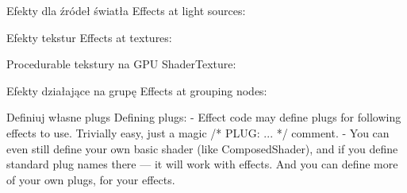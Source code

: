 \documentclass{beamer}
\begin{document}
\begin{frame}{Efekty dla źródeł światła}
  Effects at light sources:
\end{frame}

\begin{frame}{Efekty tekstur}
  Effects at textures:
\end{frame}

\begin{frame}{Procedurable tekstury na GPU}
  ShaderTexture:
\end{frame}

\begin{frame}{Efekty działające na grupę}
  Effects at grouping nodes:
\end{frame}

\begin{frame}{Definiuj własne plugs}
  Defining plugs:
  - Effect code may define plugs for following effects to use.
    Trivially easy, just a magic /* PLUG: ... */ comment.
  - You can even still define your own basic shader (like ComposedShader),
    and if you define standard plug names there --- it will work
    with effects. And you can define more of your own plugs,
    for your effects.
\end{frame}
\end{document}
